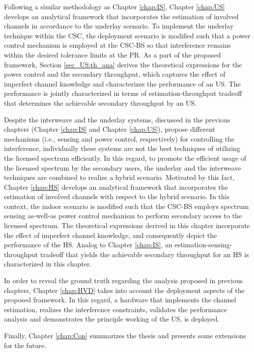 Following a similar methodology as Chapter \ref{chap:IS}, Chapter \ref{chap:US} develops an analytical framework that incorporates the estimation of involved channels in accordance to the underlay scenario. To implement the underlay technique within the CSC, the deployment scenario is modified such that a power control mechanism is employed at the CSC-BS so that interference remains within the desired tolerance limits at the PR. As a part of the proposed framework, Section \ref{sec_US:th_ana} derives the theoretical expressions for the power control and the secondary throughput, which captures the effect of imperfect channel knowledge and characterizes the performance of an US. The performance is jointly characterized in terms of estimation-throughput tradeoff that determines the achievable secondary throughput by an US. 

Despite the interweave and the underlay systems, discussed in the previous chapters (Chapter \ref{chap:IS} and Chapter \ref{chap:US}), propose different mechanisms (i.e., sensing and power control, respectively) for controlling the interference, individually these systems are not the best techniques of utilizing the licensed spectrum efficiently. In this regard, to promote the efficient usage of the licensed spectrum by the secondary users, the underlay and the interweave techniques are combined to realize a hybrid scenario. Motivated by this fact, Chapter \ref{chap:HS} develops an analytical framework that incorporates the estimation of involved channels with respect to the hybrid scenario. In this context, the indoor scenario is modified such that the CSC-BS employs spectrum sensing as-well-as power control mechanism to perform secondary access to the licensed spectrum. The theoretical expressions derived in this chapter incorporate the effect of imperfect channel knowledge, and consequently depict the performance of the HS. Analog to Chapter \ref{chap:IS}, an estimation-sensing-throughput tradeoff that yields the achievable secondary throughput for an HS is characterized in this chapter. 

 
In order to reveal the ground truth regarding the analysis proposed in previous chapters, Chapter \ref{chap:HVD} takes into account the deployment aspects of the proposed framework. In this regard, a hardware that implements the channel estimation, realizes the interference constraints, validates the performance analysis and demonstrates the principle working of the US, is deployed.   

Finally, Chapter \ref{chap:Con} summarizes the thesis and presents some extensions for the future. 
